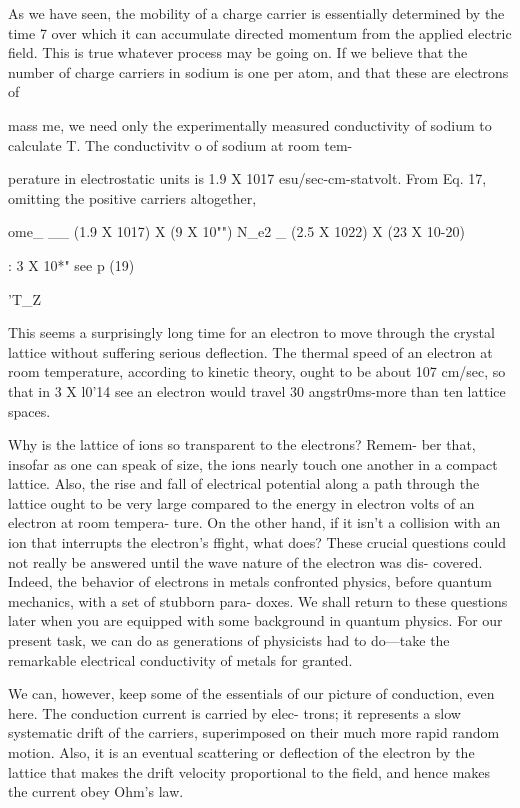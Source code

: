 As we have seen, the mobility of a charge carrier is essentially determined
by the time 7 over which it can accumulate directed
momentum from the applied electric field. This is true whatever
process may be going on. If we believe that the number of charge
carriers in sodium is one per atom, and that these are electrons of

mass me, we need only the experimentally measured conductivity of
sodium to calculate T. The conductivitv o of sodium at room tem-

perature in electrostatic units is 1.9 X 1017 esu/sec-cm-statvolt.
From Eq. 17, omitting the positive carriers altogether,

ome_ __ (1.9 X 1017) X (9 X 10"")
N_e2 _ (2.5 X 1022) X (23 X 10-20)

: 3 X 10*" see p (19)

'T_Z
\begin{equation}
\end{equation}

This seems a surprisingly long time for an electron to move through
the crystal lattice without suffering serious deflection. The thermal
speed of an electron at room temperature, according to kinetic
theory, ought to be about 107 cm/sec, so that in 3 X l0'14 see an
electron would travel 30 angstr0ms-more than ten lattice spaces.

Why is the lattice of ions so transparent to the electrons? Remem-
ber that, insofar as one can speak of size, the ions nearly touch one
another in a compact lattice. Also, the rise and fall of electrical
potential along a path through the lattice ought to be very large compared
to the energy in electron volts of an electron at room tempera-
ture. On the other hand, if it isn't a collision with an ion that interrupts
the electron's ffight, what does? These crucial questions could
not really be answered until the wave nature of the electron was dis-
covered. Indeed, the behavior of electrons in metals confronted
physics, before quantum mechanics, with a set of stubborn para-
doxes. We shall return to these questions later when you are
equipped with some background in quantum physics. For our
present task, we can do as generations of physicists had to do---take
the remarkable electrical conductivity of metals for granted.

We can, however, keep some of the essentials of our picture of
conduction, even here. The conduction current is carried by elec-
trons; it represents a slow systematic drift of the carriers, superimposed
on their much more rapid random motion. Also, it is an
eventual scattering or deflection of the electron by the lattice that
makes the drift velocity proportional to the field, and hence makes
the current obey Ohm's law.

